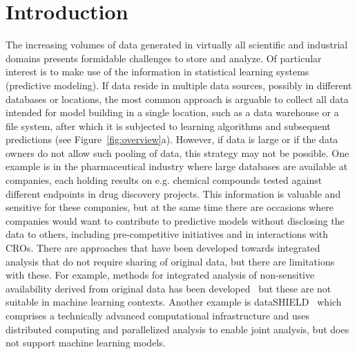 \documentclass[main]{subfiles}
\newcommand{\todo}[1]{{\color{blue} #1 }}
\begin{document}
\section{Introduction}

The increasing volumes of data generated in virtually all scientific and industrial domains presents formidable challenges to store and analyze. Of particular interest is to make use of the information in statistical learning systems (predictive modeling). If data reside in multiple data sources, possibly in different databases or locations, the most common approach is arguable to collect all data intended for model building in a single location, such as a data warehouse or a file system, after which it is subjected to learning algorithms and subsequent predictions (see Figure~\ref{fig:overview}a). However, if data is large or if the data owners do not allow such pooling of data, this strategy may not be possible. One example is in the pharmaceutical industry where large databases are available at companies, each holding results on e.g. chemical compounds tested against different endpoints in drug discovery projects. This information is valuable and sensitive for these companies, but at the same time there are occasions where companies would want to contribute to predictive models without disclosing the data to others, including pre-competitive initiatives and in interactions with CROs. There are approaches that have been developed towards integrated analysis that do not require sharing of original data, but there are limitations with these. For example, methods for integrated analysis of non-sensitive availability derived from original data has been developed~\cite{Spjuth:2016ly} but these are not suitable in machine learning contexts. Another example is dataSHIELD~\citep{Gaye:2014sf} which comprises a technically advanced computational infrastructure and uses distributed computing and parallelized analysis to enable joint analysis, but does not support machine learning models. %
 
\end{document}

